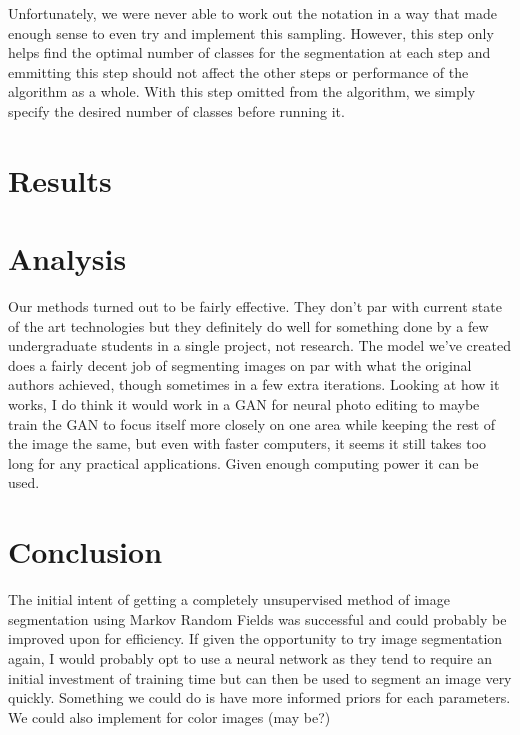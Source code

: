 \documentclass[11pt]{article}
\begin{document}
Unfortunately, we were never able to work out the notation in a way that made enough sense to even try and implement this sampling.
However, this step only helps find the optimal number of classes for the segmentation at each step and emmitting this step should not affect the other steps or performance of the algorithm as a whole.
With this step omitted from the algorithm, we simply specify the desired number of classes before running it.

\section{Results}


\section{Analysis}
Our methods turned out to be fairly effective. They don’t par with current state of the art technologies but they definitely do well for something done by a few undergraduate students in a single project, not research. The model we’ve created does a fairly decent job of segmenting images on par with what the original authors achieved, though sometimes in a few extra iterations. Looking at how it works, I do think it would work in a GAN for neural photo editing to maybe train the GAN to focus itself more closely on one area while keeping the rest of the image the same, but even with faster computers, it seems it still takes too long for any practical applications. Given enough computing power it can be used.

\section{Conclusion}
The initial intent of getting a completely unsupervised method of image segmentation using Markov Random Fields was successful and could probably be improved upon for efficiency. If given the opportunity to try image segmentation again, I would probably opt to use a neural network as they tend to require an initial investment of training time but can then be used to segment an image very quickly. Something we could do is have more informed priors for each parameters. We could also implement for color images (may be?)
\end{document}
